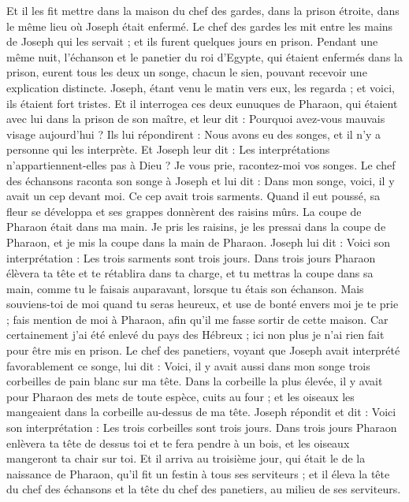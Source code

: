 \begin{multicols}{2}
Et il les fit mettre dans la maison du chef des gardes, dans la prison étroite, dans le même lieu où Joseph était enfermé.
Le chef des gardes les mit entre les mains de Joseph qui les servait ; et ils furent quelques jours en prison.
Pendant une même nuit, l'échanson et le panetier du roi d'Egypte, qui étaient enfermés dans la prison, eurent tous les deux un songe, chacun le sien, pouvant recevoir une explication distincte.
Joseph, étant venu le matin vers eux, les regarda ; et voici, ils étaient fort tristes.
Et il interrogea ces deux eunuques de Pharaon, qui étaient avec lui dans la prison de son maître, et leur dit : Pourquoi avez-vous mauvais visage aujourd'hui ?
Ils lui répondirent : Nous avons eu des songes, et il n'y a personne qui les interprète. Et Joseph leur dit : Les interprétations n'appartiennent-elles pas à Dieu ? Je vous prie, racontez-moi vos songes.
Le chef des échansons raconta son songe à Joseph et lui dit : Dans mon songe, voici, il y avait un cep devant moi.
Ce cep avait trois sarments. Quand il eut poussé, sa fleur se développa et ses grappes donnèrent des raisins mûrs.
La coupe de Pharaon était dans ma main. Je pris les raisins, je les pressai dans la coupe de Pharaon, et je mis la coupe dans la main de Pharaon.
Joseph lui dit : Voici son interprétation : Les trois sarments sont trois jours.
Dans trois jours Pharaon élèvera ta tête et te rétablira dans ta charge, et tu mettras la coupe dans sa main, comme tu le faisais auparavant, lorsque tu étais son échanson.
Mais souviens-toi de moi quand tu seras heureux, et use de bonté envers moi je te prie ; fais mention de moi à Pharaon, afin qu'il me fasse sortir de cette maison.
Car certainement j'ai été enlevé du pays des Hébreux ; ici non plus je n'ai rien fait pour être mis en prison.
Le chef des panetiers, voyant que Joseph avait interprété favorablement ce songe, lui dit : Voici, il y avait aussi dans mon songe trois corbeilles de pain blanc sur ma tête.
Dans la corbeille la plus élevée, il y avait pour Pharaon des mets de toute espèce, cuits au four ; et les oiseaux les mangeaient dans la corbeille au-dessus de ma tête.
Joseph répondit et dit : Voici son interprétation : Les trois corbeilles sont trois jours.
Dans trois jours Pharaon enlèvera ta tête de dessus toi et te fera pendre à un bois, et les oiseaux mangeront ta chair sur toi.
Et il arriva au troisième jour, qui était le de la naissance de Pharaon, qu'il fit un festin à tous ses serviteurs ; et il éleva la tête du chef des échansons et la tête du chef des panetiers, au milieu de ses serviteurs.

\end{multicols}
